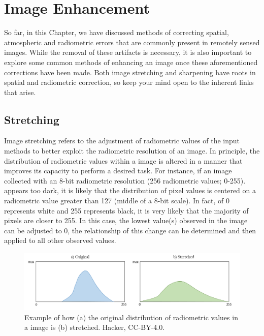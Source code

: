 \documentclass[
]{book}
\begin{document}
\section{Image Enhancement}\label{image-enhancement}

So far, in this Chapter, we have discussed methods of correcting spatial, atmospheric and radiometric errors that are commonly present in remotely sensed images. While the removal of these artifacts is necessary, it is also important to explore some common methods of enhancing an image once these aforementioned corrections have been made. Both image stretching and sharpening have roots in spatial and radiometric correction, so keep your mind open to the inherent links that arise.

\subsection{Stretching}\label{stretching}

Image stretching refers to the adjustment of radiometric values of the input methods to better exploit the radiometric resolution of an image. In principle, the distribution of radiometric values within a image is altered in a manner that improves its capacity to perform a desired task. For instance, if an image collected with an 8-bit radiometric resolution (256 radiometric values; 0-255). appears too dark, it is likely that the distribution of pixel values is centered on a radiometric value greater than 127 (middle of a 8-bit scale). In fact, of 0 represents white and 255 represents black, it is very likely that the majority of pixels are closer to 255. In this case, the lowest value(s) observed in the image can be adjusted to 0, the relationship of this change can be determined and then applied to all other observed values.

\begin{figure}
\includegraphics[width=1\linewidth]{images/13-stretch} \caption{Example of how (a) the original distribution of radiometric values in a image is (b) stretched. Hacker, CC-BY-4.0.}\label{fig:13-stretch}
\end{figure}
\end{document}
